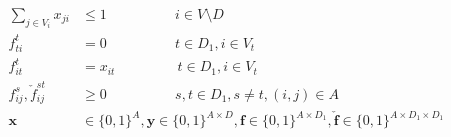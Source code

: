 \begin{subequations}
\begin{flalign}
\label{con:pf2:B}  \sum_{j\in V_i}x_{ji}&\leq 1~~~~ \qquad  \qquad i\in V\setminus D\\
\label{con:pf2:noflowFromT} f_{ti}^t&=0 ~~~~ \qquad  \qquad t\in D_1, i\in V_t   \\
\label{con:pf2:fitt=xit} f_{it}^t&=x_{it} ~~ \qquad  \qquad t\in D_1, i\in V_t \\
		 			  \label{con:pf2:dim1}  f^s_{ij},\check{f}^{st}_{ij}    & \geq 0    ~~~~ \qquad \qquad	 s,t\in D_1,s\neq t,(i,j)\in A \\			   			  
 \label{con:pf2:dim2}  \mathbf{x}    & \in \{0,1\}^A ,\mathbf{y}  \in \{0,1\}^{A\times D}, \mathbf{f}\in \{0,1\}^{A\times D_1}, \mathbf{\check{f}}\in\{0,1\}^{A\times D_1\times D_1}
    \end{flalign}~
    \end{subequations}
    
